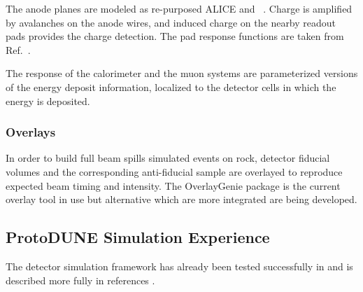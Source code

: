 \documentclass[../main-v1.tex]{subfiles}
\begin{document}
The anode planes are modeled as re-purposed ALICE %
 and  ~\cite{Dellacasa:2000bm}.  Charge is amplified by avalanches on the anode wires, and induced charge on the nearby readout pads provides the charge detection.  The pad response functions are taken from Ref.~\cite{Dellacasa:2000bm}.

The response of the calorimeter and the muon systems are parameterized versions of the energy deposit information, localized to the detector cells in which the energy is deposited.

\subsubsection{Overlays}
In order to build full beam spills simulated events on rock, detector fiducial volumes and the corresponding anti-fiducial sample are overlayed to reproduce expected beam timing and intensity. The OverlayGenie package is the current overlay tool in use but alternative which are more integrated are being developed. 


\subsection{ProtoDUNE Simulation Experience }

The detector simulation framework has already been tested successfully in  and is described more fully in references \cite{DUNE:2021hwx,DUNE:2020cqd}.
\end{document}
